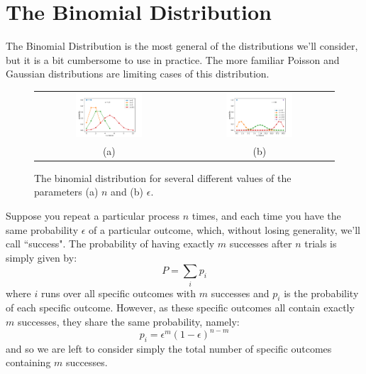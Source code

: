 \documentclass[12pt,oneside]{book}
\begin{document}
\section{The  Binomial Distribution}

The Binomial Distribution is the most general of the distributions we'll consider, but it is a bit cumbersome to use in practice.  The more familiar Poisson and Gaussian distributions are limiting cases of this distribution.  

\begin{figure}[htbp]
\begin{center}
\begin{tabular}{cc}
{\includegraphics[width=0.47\textwidth]{figs/binom_n.pdf}} &
{\includegraphics[width=0.47\textwidth]{figs/binom_eps.pdf}} \\
(a) & (b) \\
\end{tabular}
\end{center}
\caption{\label{fig:binom} The binomial distribution for several different values of the parameters (a) $n$ and (b) $\epsilon$.}
\end{figure}

Suppose you repeat a particular process $n$ times, and each time you have the same probability $\epsilon$ of a particular outcome, which, without losing generality, we'll call ``success".  The probability of having exactly $m$ successes after $n$ trials is simply given by:
\begin{displaymath}
P = \sum_i p_i
\end{displaymath}
where $i$ runs over all specific outcomes with $m$ successes and $p_i$ is the probability of each specific outcome.   However, as these specific outcomes all contain exactly $m$ successes, they share the same probability, namely:
\begin{displaymath}
p_i = \epsilon^m (1 - \epsilon)^{n-m}
\end{displaymath}
and so we are left to consider simply the total number of specific outcomes containing $m$ successes.  
\end{document}
